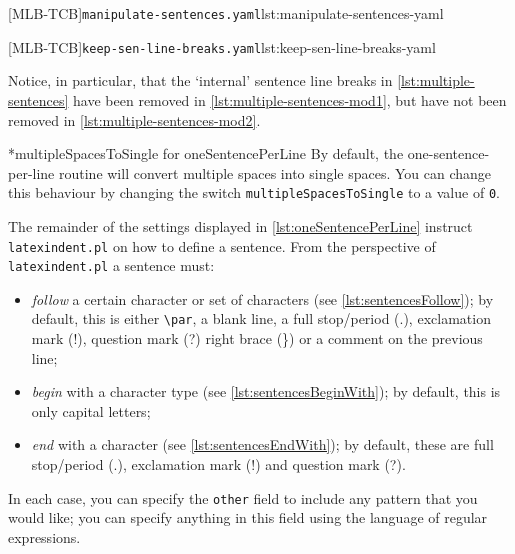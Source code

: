  \begin{cmhtcbraster}
  [MLB-TCB]{\texttt{manipulate-sentences.yaml}}{lst:manipulate-sentences-yaml}
 \end{cmhtcbraster}

 \begin{cmhtcbraster}
  [MLB-TCB]{\texttt{keep-sen-line-breaks.yaml}}{lst:keep-sen-line-breaks-yaml}
 \end{cmhtcbraster}

 Notice, in particular, that the `internal' sentence line breaks in
 \cref{lst:multiple-sentences} have been removed in \cref{lst:multiple-sentences-mod1},
 but have not been removed in \cref{lst:multiple-sentences-mod2}.

 *{multipleSpacesToSingle for oneSentencePerLine} By default, the
 one-sentence-per-line routine will convert multiple spaces into single spaces. You can
 change this behaviour by changing the switch \texttt{multipleSpacesToSingle} to a value
 of \texttt{0}.

 The remainder of the settings displayed in \vref{lst:oneSentencePerLine} instruct
 \texttt{latexindent.pl} on how to define a sentence. From the perspective of
 \texttt{latexindent.pl} a sentence must:   
 \begin{itemize}
  \item \emph{follow} a certain character or set of characters (see
        \cref{lst:sentencesFollow}); by default, this is either \lstinline!\par!, a
        blank line, a full stop/period (.), exclamation mark (!), question mark (?) right brace
        (\}) or a comment on the previous line;
  \item \emph{begin} with a character type (see \cref{lst:sentencesBeginWith}); by
        default, this is only capital letters;
  \item \emph{end} with a character (see \cref{lst:sentencesEndWith}); by
        default, these are full stop/period (.), exclamation mark (!) and question mark (?).
 \end{itemize}
 In each case, you can specify the \texttt{other} field to include any pattern that you
 would like; you can specify anything in this field using the language of regular
 expressions.  


